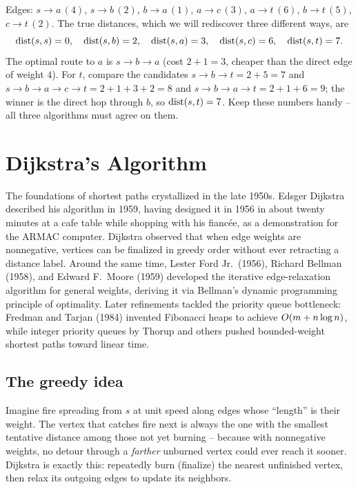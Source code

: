 Edges: $s\!\to\!a\,(4)$, $s\!\to\!b\,(2)$, $b\!\to\!a\,(1)$, $a\!\to\!c\,(3)$,
$a\!\to\!t\,(6)$, $b\!\to\!t\,(5)$, $c\!\to\!t\,(2)$. The true distances, which we will
rediscover three different ways, are
\[
  \operatorname{dist}(s,s)=0,\quad \operatorname{dist}(s,b)=2,\quad \operatorname{dist}(s,a)=3,\quad \operatorname{dist}(s,c)=6,\quad \operatorname{dist}(s,t)=7.
\]
The optimal route to $a$ is $s\to b\to a$ (cost $2+1=3$, cheaper than the direct edge of
weight $4$). For $t$, compare the candidates $s\to b\to t = 2+5 = 7$ and
$s\to b\to a\to c\to t = 2+1+3+2 = 8$ and $s\to b\to a\to t = 2+1+6 = 9$; the winner is the
direct hop through $b$, so $\operatorname{dist}(s,t)=7$. Keep these numbers handy -- all three algorithms
must agree on them.

\section{Dijkstra's Algorithm}
\label{ch07:dijkstra}

\begin{historybox}
The foundations of shortest paths crystallized in the late 1950s. Edsger Dijkstra described his algorithm in 1959, having designed it in 1956 in about twenty minutes at a cafe table while shopping with his fianc{\'e}e, as a demonstration for the ARMAC computer. Dijkstra observed that when edge weights are nonnegative, vertices can be finalized in greedy order without ever retracting a distance label. Around the same time, Lester Ford Jr.\ (1956), Richard Bellman (1958), and Edward F.~Moore (1959) developed the iterative edge-relaxation algorithm for general weights, deriving it via Bellman's dynamic programming principle of optimality. Later refinements tackled the priority queue bottleneck: Fredman and Tarjan (1984) invented Fibonacci heaps to achieve $O(m + n \log n)$, while integer priority queues by Thorup and others pushed bounded-weight shortest paths toward linear time.
\end{historybox}

\subsection{The greedy idea}

\begin{intuitionbox}
Imagine fire spreading from $s$ at unit speed along edges whose ``length'' is their weight.
The vertex that catches fire next is always the one with the smallest tentative distance
among those not yet burning -- because with nonnegative weights, no detour through a
\emph{farther} unburned vertex could ever reach it sooner. Dijkstra is exactly this:
repeatedly burn (finalize) the nearest unfinished vertex, then relax its outgoing edges to
update its neighbors.
\end{intuitionbox}

